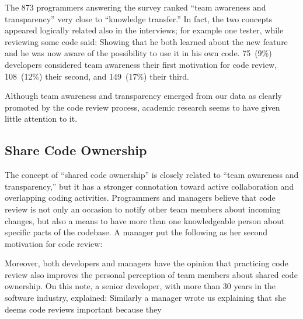 The 873 programmers answering the survey ranked ``team awareness and
transparency'' very close to ``knowledge transfer.'' In fact, the two concepts
appeared logically related also in the interviews; for example one tester,
while reviewing some code said:  Showing that he both
learned about the new feature and he was now aware of the possibility to use it
in his own code. 75~(9\%) developers considered team awareness their first
motivation for code review, 108~(12\%) their second, and 149~(17\%) their
third. 

Although team awareness and transparency emerged from our data as clearly
promoted by the code review process, academic research seems to have given
little attention to it. 

\subsection{Share Code Ownership}

The concept of ``shared code ownership'' is closely related to ``team awareness
and transparency,'' but it has a stronger connotation toward active
collaboration and overlapping coding activities. Programmers and managers
believe that code review is not only an occasion to notify other team members
about incoming changes, but also a means to have more than one knowledgeable
person about specific parts of the codebase. A manager put the following as her
second motivation for code review: 

Moreover, both developers and managers have the opinion that practicing code
review also improves the personal perception of team members about shared code
ownership. On this note, a senior developer, with more than 30 years in the
software industry, explained:  Similarly a manager wrote us explaining that she deems code
reviews important because they 

